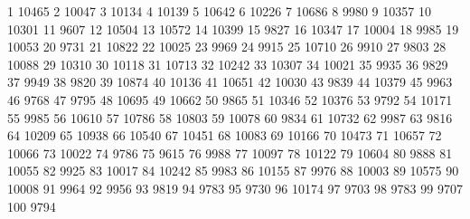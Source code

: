 1 10465
2 10047
3 10134
4 10139
5 10642
6 10226
7 10686
8 9980
9 10357
10 10301
11 9607
12 10504
13 10572
14 10399
15 9827
16 10347
17 10004
18 9985
19 10053
20 9731
21 10822
22 10025
23 9969
24 9915
25 10710
26 9910
27 9803
28 10088
29 10310
30 10118
31 10713
32 10242
33 10307
34 10021
35 9935
36 9829
37 9949
38 9820
39 10874
40 10136
41 10651
42 10030
43 9839
44 10379
45 9963
46 9768
47 9795
48 10695
49 10662
50 9865
51 10346
52 10376
53 9792
54 10171
55 9985
56 10610
57 10786
58 10803
59 10078
60 9834
61 10732
62 9987
63 9816
64 10209
65 10938
66 10540
67 10451
68 10083
69 10166
70 10473
71 10657
72 10066
73 10022
74 9786
75 9615
76 9988
77 10097
78 10122
79 10604
80 9888
81 10055
82 9925
83 10017
84 10242
85 9983
86 10155
87 9976
88 10003
89 10575
90 10008
91 9964
92 9956
93 9819
94 9783
95 9730
96 10174
97 9703
98 9783
99 9707
100 9794
